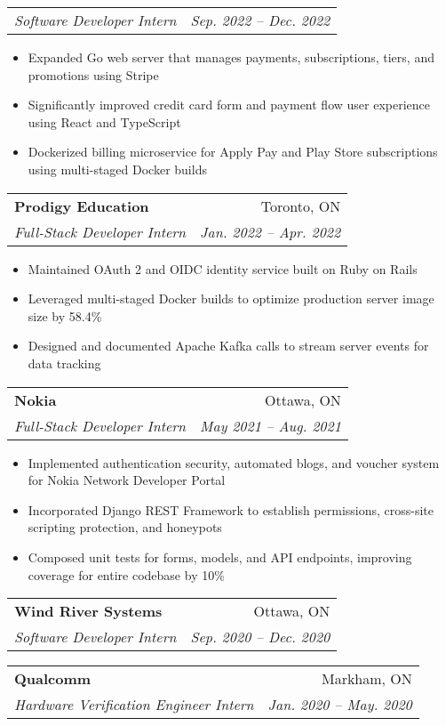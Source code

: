 \documentclass[letterpaper,11pt]{article}
\makeatletter
\newcommand{\resumeItem}[1]{
  \item\small{
    {#1 \vspace{-2pt}}
  }
}
\newcommand{\resumeSubheading}[4]{
  \vspace{-2pt}\item
    \begin{tabular*}{0.97\textwidth}[t]{l@{\extracolsep{\fill}}r}
      \textbf{#1} & #2 \\
      \textit{\small#3} & \textit{\small #4} \\
    \end{tabular*}\vspace{-7pt}
}
\newcommand{\resumeSubSubheading}[2]{
    \item
    \begin{tabular*}{0.97\textwidth}{l@{\extracolsep{\fill}}r}
      \textit{\small#1} & \textit{\small #2} \\
    \end{tabular*}\vspace{-7pt}
}
\newcommand{\resumeItemListStart}{\begin{itemize}}
\newcommand{\resumeItemListEnd}{\end{itemize}\vspace{-5pt}}
\makeatother
\begin{document}
    \resumeSubSubheading
      {Software Developer Intern}{Sep. 2022 -- Dec. 2022}
      \resumeItemListStart
        \resumeItem{Expanded Go web server that manages payments, subscriptions, tiers, and promotions using Stripe}
        \resumeItem{Significantly improved credit card form and payment flow user experience using React and TypeScript}
        \resumeItem{Dockerized billing microservice for Apply Pay and Play Store subscriptions using multi-staged Docker builds}
      \resumeItemListEnd

    \resumeSubheading
      {Prodigy Education}{Toronto, ON}
      {Full-Stack Developer Intern}{Jan. 2022 -- Apr. 2022}
      \resumeItemListStart
        \resumeItem{Maintained OAuth 2 and OIDC identity service built on Ruby on Rails}
        \resumeItem{Leveraged multi-staged Docker builds to optimize production server image size by 58.4\%}
        \resumeItem{Designed and documented Apache Kafka calls to stream server events for data tracking}
      \resumeItemListEnd

    \resumeSubheading
      {Nokia}{Ottawa, ON}
      {Full-Stack Developer Intern}{May 2021 -- Aug. 2021}
      \resumeItemListStart
        \resumeItem{Implemented authentication security, automated blogs, and voucher system for Nokia Network Developer Portal}
        \resumeItem{Incorporated Django REST Framework to establish permissions, cross-site scripting protection, and honeypots}
        \resumeItem{Composed unit tests for forms, models, and API endpoints, improving coverage for entire codebase by 10\%}
      \resumeItemListEnd

    \resumeSubheading
      {Wind River Systems}{Ottawa, ON}
      {Software Developer Intern}{Sep. 2020 -- Dec. 2020}

    \vspace{2pt}
    \resumeSubheading
      {Qualcomm}{Markham, ON}
      {Hardware Verification Engineer Intern}{Jan. 2020 -- May. 2020}
\end{document}

